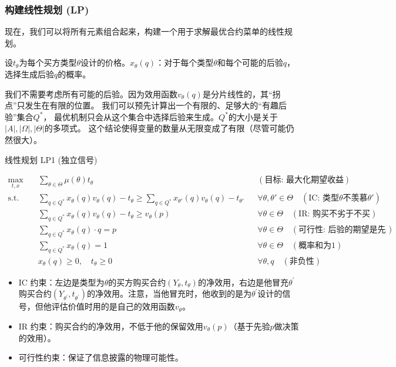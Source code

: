 \subsubsection{构建线性规划 (LP)}

现在，我们可以将所有元素组合起来，构建一个用于求解最优合约菜单的线性规划。

设$t_\theta$为每个买方类型$\theta$设计的价格。$x_\theta(q)$：对于每个类型$\theta$和每个可能的后验$q$，选择生成后验$q$的概率。

我们不需要考虑所有可能的后验。因为效用函数$v_\theta (q)$是分片线性的，其“拐点”只发生在有限的位置。
我们可以预先计算出一个有限的、足够大的“有趣后验”集合$Q^\ast$，
最优机制只会从这个集合中选择后验来生成。$Q^\ast$的大小是关于$|A|,|\Omega|,|\Theta|$的多项式。
这个结论使得变量的数量从无限变成了有限（尽管可能仍然很大）。

线性规划 LP1 (独立信号)

\begin{align*}
    \max_{t,x} \quad & \sum_{\theta \in \Theta} \mu(\theta) t_{\theta} && (\text{目标: 最大化期望收益}) \\
    \text{s.t.} \quad & \sum_{q \in Q^*} x_{\theta}(q) v_{\theta}(q) - t_{\theta} \geq \sum_{q \in Q^*} x_{\theta'}(q) v_{\theta}(q) - t_{\theta'} && \forall \theta, \theta' \in \Theta \quad (\text{IC: 类型}\theta\text{不羡慕}\theta') \\
    & \sum_{q \in Q^*} x_{\theta}(q) v_{\theta}(q) - t_{\theta} \geq v_{\theta}(p) && \forall \theta \in \Theta \quad (\text{IR: 购买不劣于不买}) \\
    & \sum_{q \in Q^*} x_{\theta}(q) \cdot q = p && \forall \theta \in \Theta \quad (\text{可行性: 后验的期望是先验}) \\
    & \sum_{q \in Q^*} x_{\theta}(q) = 1 && \forall \theta \in \Theta \quad (\text{概率和为1}) \\
    & x_{\theta}(q) \geq 0, \quad t_{\theta} \geq 0 && \forall \theta, q \quad (\text{非负性})
\end{align*}

\begin{itemize}
    \item IC 约束：左边是类型为$\theta$的买方购买合约$(Y_\theta,t_\theta)$的净效用，右边是他冒充$\theta^\prime$购买合约$(Y_{\theta^\prime},t_{\theta^\prime})$的净效用。注意，当他冒充时，他收到的是为$\theta^\prime$设计的信号，但他评估价值时用的是自己的效用函数$v_\theta$。
    \item IR 约束：购买合约的净效用，不低于他的保留效用$v_\theta (p)$（基于先验$p$做决策的效用）。
    \item 可行性约束：保证了信息披露的物理可能性。
\end{itemize}

